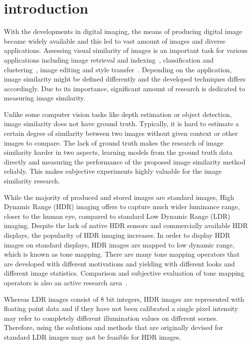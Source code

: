 \chapter{introduction}
\label{chp:b1}
With the developments in digital imaging, the means of producing digital image became widely available and this led to vast amount of images and diverse applications. Assessing visual similarity of images is an important task for various applications including image retrieval and indexing~\cite{liu2007survey}, classification and clustering~\cite{kleiman2016toward}, image editing and style transfer~\cite{rawat2018find}. Depending on the application, image similarity might be defined differently and the developed techniques differs accordingly. Due to its importance, significant amount of research is dedicated to measuring image similarity. 

Unlike some computer vision tasks like depth estimation or object detection, image similarity does not have ground truth. Typically, it is hard to estimate a certain degree of similarity between two images without given context or other images to compare. The lack of ground truth makes the research of image similarity harder in two aspects, learning models from the ground truth data directly and measuring the performance of the proposed image similarity method reliably. This makes subjective experiments highly valuable for the image similarity research.

While the majority of produced and stored images are standard images, High Dynamic Range (HDR) imaging offers to capture much wider luminance range, closer to the human eye, compared to standard Low Dynamic Range (LDR) imaging. Despite the lack of native HDR sensors and commercially available HDR displays, the popularity of HDR imaging increases. In order to display HDR images on standard displays, HDR images are mapped to low dynamic range, which is known as tone mapping. There are many tone mapping operators that are developed with different motivations and yielding with different looks and different image statistics. Comparison and subjective evaluation of tone mapping operators is also an active research area~\cite{kundu2017large, krasula2016preference}.

Whereas LDR images consist of 8 bit integers, HDR images are represented with floating point data and if they have not been calibrated a single pixel intensity may refer to completely different illumination values on different scenes. Therefore, using the solutions and methods that are originally devised for standard LDR images may not be feasible for HDR images.


